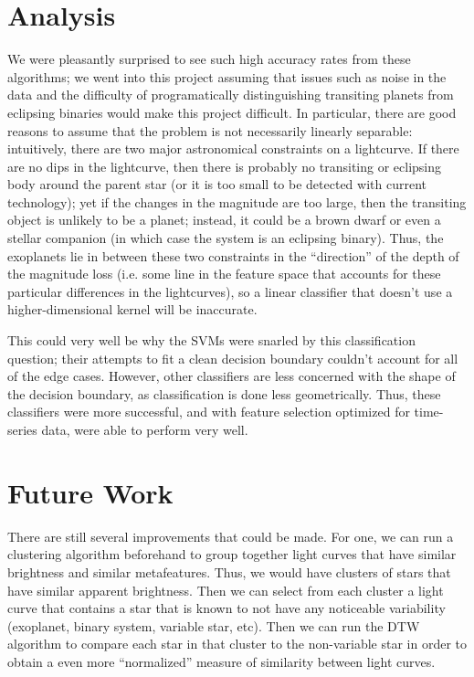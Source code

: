 \documentclass{amsart}
\begin{document}
\section{Analysis}

We were pleasantly surprised to see such high accuracy rates from these algorithms; we went into this project assuming that issues such as noise in the data and the difficulty of programatically distinguishing transiting planets from eclipsing binaries would make this project difficult. In particular, there are good reasons to assume that the problem is not necessarily linearly separable: intuitively, there are two major astronomical constraints on a lightcurve. If there are no dips in the lightcurve, then there is probably no transiting or eclipsing body around the parent star (or it is too small to be detected with current technology); yet if the changes in the magnitude are too large, then the transiting object is unlikely to be a planet; instead, it could be a brown dwarf or even a stellar companion (in which case the system is an eclipsing binary). Thus, the exoplanets lie in between these two constraints in the ``direction'' of the depth of the magnitude loss (i.e. some line in the feature space that accounts for these particular differences in the lightcurves), so a linear classifier that doesn't use a higher-dimensional kernel will be inaccurate.

This could very well be why the SVMs were snarled by this classification question; their attempts to fit a clean decision boundary couldn't account for all of the edge cases. However, other classifiers are less concerned with the shape of the decision boundary, as classification is done less geometrically. Thus, these classifiers were more successful, and with feature selection optimized for time-series data, were able to perform very well.
\section{Future Work}
There are still several improvements that could be made. For one, we can run a clustering algorithm beforehand to group together light curves that have similar brightness and similar metafeatures. Thus, we would have clusters of stars that have similar apparent brightness. Then we can select from each cluster a light curve that contains a star that is known to not have any noticeable variability (exoplanet, binary system, variable star, etc). Then we can run the DTW algorithm to compare each star in that cluster to the non-variable star in order to obtain a even more ``normalized'' measure of similarity between light curves. 
\end{document}

